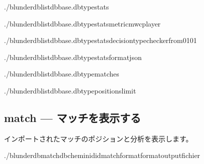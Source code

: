 \documentclass[letterpaper,10pt,dvipdfmx]{sphinxmanual}
\begin{document}
\begin{sphinxVerbatim}[commandchars=\\\{\}]
./blunderdblist\PYGZhy{}\PYGZhy{}dbbase.db\PYGZhy{}\PYGZhy{}typestats

./blunderdblist\PYGZhy{}\PYGZhy{}dbbase.db\PYGZhy{}\PYGZhy{}typestats\PYGZhy{}\PYGZhy{}metricmwc\PYGZhy{}\PYGZhy{}player

./blunderdblist\PYGZhy{}\PYGZhy{}dbbase.db\PYGZhy{}\PYGZhy{}typestats\PYGZhy{}\PYGZhy{}decision\PYGZhy{}typechecker\PYGZhy{}\PYGZhy{}from\PYGZhy{}01\PYGZhy{}01

./blunderdblist\PYGZhy{}\PYGZhy{}dbbase.db\PYGZhy{}\PYGZhy{}typestats\PYGZhy{}\PYGZhy{}formatjson

./blunderdblist\PYGZhy{}\PYGZhy{}dbbase.db\PYGZhy{}\PYGZhy{}typematches

./blunderdblist\PYGZhy{}\PYGZhy{}dbbase.db\PYGZhy{}\PYGZhy{}typepositions\PYGZhy{}\PYGZhy{}limit
\end{sphinxVerbatim}


\subsection{match — マッチを表示する}
\label{\detokenize{cli:match-afficher-un-match}}
\sphinxAtStartPar
インポートされたマッチのポジションと分析を表示します。

\begin{sphinxVerbatim}[commandchars=\\\{\}]
./blunderdbmatch\PYGZhy{}\PYGZhy{}db\PYGZlt{}chemin\PYGZgt{}\PYGZhy{}\PYGZhy{}id\PYGZlt{}id\PYGZus{}match\PYGZgt{}\PYG{o}{[}\PYGZhy{}\PYGZhy{}format\PYGZlt{}format\PYGZgt{}\PYG{o}{]}\PYG{o}{[}\PYGZhy{}\PYGZhy{}output\PYGZlt{}fichier\PYGZgt{}\PYG{o}{]}
\end{sphinxVerbatim}
\end{document}

